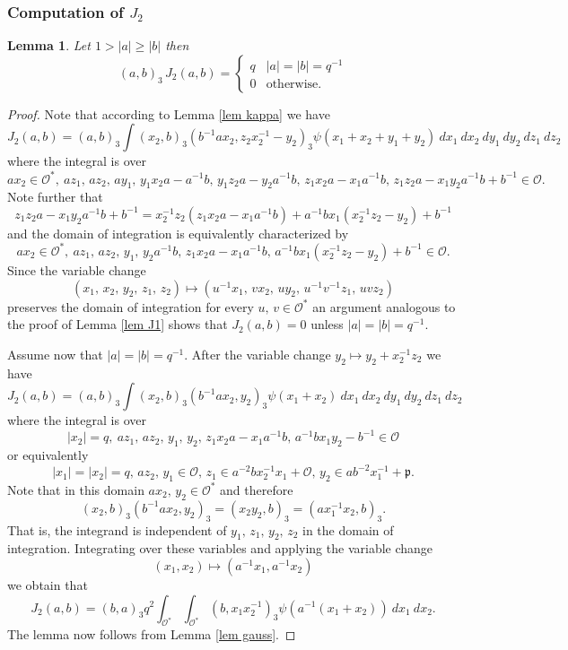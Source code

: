 \documentclass[12pt]{amsart}
\newcommand{\abs}[1]{\left|{#1}\right|}
\newcommand{\p}{\mathfrak{p}}
\renewcommand{\O}{\mathcal{O}}
\newtheorem{lemma}[theorem]{Lemma}
\theoremstyle{remark}
\begin{document}
\subsubsection{Computation of $J_2$}

\begin{lemma}\label{lem J2}
Let $1>\abs{a}\ge\abs{b}$ then 
\[
(a,b)_3\,J_2(a,b)=\begin{cases} q & \abs{a}=\abs{b}=q^{-1} \\ 0 & \text{otherwise.}\end{cases}
\]
\end{lemma}
\begin{proof}
Note that according to Lemma \ref{lem kappa} we have
\[
J_2(a,b)=(a,b)_3\int (x_2,b)_3(b^{-1}ax_2,z_2x_2^{-1}-y_2)_3  \psi(x_1+x_2+y_1+y_2)\ dx_1\ dx_2\ dy_1\ dy_2\ dz_1\ dz_2
\]
where the integral is over
\[
ax_2\in \O^*,\ az_1,\,az_2,\,ay_1,\, y_1x_2 a-a^{-1}b,\,y_1z_2a-y_2a^{-1}b ,\,z_1x_2a-x_1a^{-1}b,\,  z_1z_2 a-x_1y_2a^{-1}b+b^{-1}\in \O.
\]
Note further that
\[
z_1z_2 a-x_1y_2a^{-1}b+b^{-1}=x_2^{-1}z_2(z_1x_2a-x_1a^{-1}b)+a^{-1}bx_1(x_2^{-1}z_2-y_2)+b^{-1}
\]
and the domain of integration is equivalently characterized by
\[
ax_2\in \O^*,\ az_1,\,az_2,\,y_1,\,y_2a^{-1}b ,\,z_1x_2a-x_1a^{-1}b,\,  a^{-1}bx_1(x_2^{-1}z_2-y_2)+b^{-1}\in \O.
\]
Since the variable change 
\[
(x_1,\,x_2,\,y_2,\,z_1,\,z_2)\mapsto (u^{-1}x_1,\,vx_2,\,uy_2,\,u^{-1}v^{-1}z_1,\,uvz_2)
\]
preserves the domain of integration for every $u,\,v\in \O^*$ an argument analogous to the proof of Lemma \ref{lem J1} shows that $J_2(a,b)=0$ unless $\abs{a}=\abs{b}=q^{-1}$.

Assume now that $\abs{a}=\abs{b}=q^{-1}$. 
After the variable change $y_2\mapsto y_2+x_2^{-1}z_2$ we have
\[
J_2(a,b)=(a,b)_3\int (x_2,b)_3(b^{-1}ax_2,y_2)_3   \psi(x_1+x_2)\ dx_1\ dx_2\ dy_1\ dy_2\ dz_1\ dz_2
\]
where the integral is over
\[
\abs{x_2}=q,\ az_1,\,az_2,\,y_1,\,y_2 ,\,z_1x_2a-x_1a^{-1}b,\,  a^{-1}bx_1y_2-b^{-1}\in \O
\]
or equivalently
\[
\abs{x_1}=\abs{x_2}=q,\,az_2,\,y_1\in \O ,\,z_1\in a^{-2}bx_2^{-1}x_1+\O,\,  y_2\in ab^{-2}x_1^{-1}+\p.
\]
Note that in this domain $ax_2,\,y_2\in \O^*$ and therefore
\[
(x_2,b)_3(b^{-1}ax_2,y_2)_3=(x_2y_2,b)_3=(ax_1^{-1}x_2,b)_3.
\]
That is, the integrand is independent of $y_1,\,z_1,\,y_2,\,z_2$ in the domain of integration. Integrating over these variables and applying the variable change
\[
(x_1,x_2)\mapsto (a^{-1}x_1,a^{-1}x_2)
\]
we obtain that 
\[
J_2(a,b)=(b,a)_3q^2\int_{\O^*}\int_{\O^*} (b,x_1x_2^{-1})_3\psi(a^{-1}(x_1+x_2))\ dx_1\ dx_2.  
\]
The lemma now follows from Lemma \ref{lem gauss}.
\end{proof}
\end{document}
